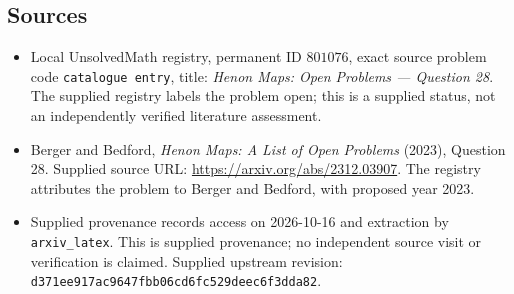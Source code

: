 \documentclass[11pt]{article}
\begin{document}
\subsection{Sources}
\begin{itemize}
\item Local UnsolvedMath registry, permanent ID \(801076\), exact source problem code \texttt{catalogue entry}, title: \emph{Henon Maps: Open Problems --- Question 28}. The supplied registry labels the problem open; this is a supplied status, not an independently verified literature assessment.
\item Berger and Bedford, \emph{Henon Maps: A List of Open Problems} (2023), Question 28. Supplied source URL: \url{https://arxiv.org/abs/2312.03907}. The registry attributes the problem to Berger and Bedford, with proposed year 2023.
\item Supplied provenance records access on 2026-10-16 and extraction by \texttt{arxiv\_latex}. This is supplied provenance; no independent source visit or verification is claimed. Supplied upstream revision: \texttt{d371ee917ac9647fbb06cd6fc529deec6f3dda82}.
\end{itemize}
\end{document}
